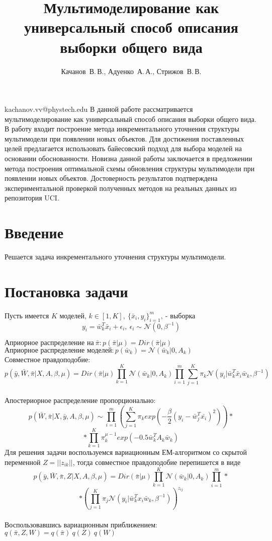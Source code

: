 \documentclass[12pt,twoside]{article}
\begin{document}
\title
    [Мультимоделирование как универсальный способ описания выборки общего вида] 
    {Мультимоделирование как универсальный способ описания выборки общего вида}
\author
    [Качанов~В.\,В.] %
    {Качанов~В.\,В., Адуенко~А.\,А., Стрижов~В.\,В.} %
\email
    {kachanov.vv@phystech.edu}
\abstract
    {В данной работе рассматривается мультимоделирование как универсальный способ описания выборки общего вида. В работу входит построение метода инкрементального уточнения структуры мультимодели при появлении новых объектов. Для достижения поставленных целей предлагается использовать байесовский подход для выбора моделей на основании обоснованности. Новизна данной работы заключается в предложении метода построения оптимальной схемы обновления структуры мультимодели при появлении новых объектов. Достоверность результатов подтверждена экспериментальной проверкой полученных методов на реальных данных из репозитория UCI.}

\maketitle
\Russian
\section{Введение}
Решается задача инкрементального уточнения структуры мультимодели. 

\section{Постановка задачи}
Пусть имеется $K$ моделей, $k \in [1,K],~\{\bar{x}_i,y_i\}_{i=1}^m,~\text{- выборка}$
$$y_i = \bar{w}_k^T\bar{x}_i+\epsilon_i,~ \epsilon_i \sim \mathcal{N}(0,\beta^{-1})$$

$\text{Априорное распределение на}~ \bar{\pi}: p(\bar{\pi} |\mu) = Dir(\bar{\pi}|\mu)$
$\text{Априорное распределение моделей}: p(\bar{w}_k) = \mathcal{N}(\bar{w}_k|0,A_k)$\\
Совместное правдоподобие:
$$p(\bar{y},\bar{W},\bar{\pi}|X,A,\beta,\mu)=Dir(\bar{\pi}|\mu)\prod\limits_{k=1}^K \mathcal{N}(\bar{w}_k|0,A_k)\prod\limits_{i=1}^m  \sum\limits_{j=1}^K\pi_k \mathcal{N}(y_i|\bar{w}_k^T \bar x_i\bar{w}_k,\beta^{-1})$$\\
Апостериорное распределение пропорционально:
$$p(\bar{W},\bar{\pi}|X,\bar y,A,\beta,\mu)\sim \prod\limits_{i=1}^m\left(\sum\limits_{j=1}^K \pi_k exp\left(-\frac{\beta}{2}(y_i - \bar{w}_j^T\bar{x_i})^2\right)\right)*$$
$$*\prod\limits_{k=1}^K\pi_k^{\mu-1}exp(-0.5\bar{w}_k^TA_k\bar{w}_k)$$
Для решения задачи воспользуемся вариационным ЕМ-алгоритмом со скрытой переменной $Z = ||z_{ik}||$, тогда совместное правдоподобие перепишется в виде
$$p(\bar{y},\bar{W},\bar{\pi},Z|X,A,\beta,\mu)=Dir(\bar{\pi}|\mu)\prod\limits_{k=1}^K \mathcal{N}(\bar{w}_k|0,A_k)\prod\limits_{i=1}^m *$$
$$*\left( \prod\limits_{j=1}^K\pi_j \mathcal{N}(y_i|\bar{w}_k^T x_i\bar{w}_k,\beta^{-1})\right)^{z_{ij}}$$\\
Воспользовавшись вариационным приближением: ~$ q(\bar{\pi},Z,W) = q(\bar{\pi})~q(Z)~q(W)$\\
\end{document}

